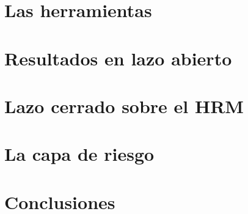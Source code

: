 \documentclass[11pt,a4paper]{article}
\theoremstyle{plain}
\theoremstyle{definition}
\begin{document}
\part{Las herramientas}






\part{Resultados en lazo abierto}


\part{Lazo cerrado sobre el HRM}






\part{La capa de riesgo}










\part{Conclusiones}


\appendix

\end{document}
